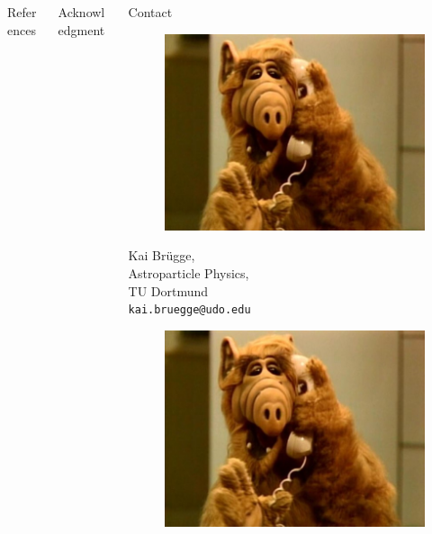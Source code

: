 \vfill
\begin{columns}[t, onlytextwidth]%
  \begin{column}{0.40\textwidth}%
    \begin{block}[equal height group=bottom]{\normalsize References}
      \footnotesize%
      \printbibliography%
    \end{block}
  \end{column}%
  \begin{column}{0.20\textwidth}%
    \begin{block}[equal height group=bottom]{\normalsize Acknowledgment}
        \footnotesize
        
    \end{block}
  \end{column}%
  \begin{column}{0.40\textwidth}%
    \begin{block}[equal height group=bottom]{\normalsize Contact}
      \begin{multicols}{4}
          \begin{figure}
            \includegraphics[width=0.5\linewidth]{images/alf.jpg}
          \end{figure}
          \columnbreak
              \footnotesize
                  Kai Brügge, \\
                  Astroparticle Physics, \\
                  TU Dortmund \\
                  \texttt{kai.bruegge@udo.edu}
          \columnbreak
            \begin{figure}
              \includegraphics[width=0.5\linewidth]{images/alf.jpg}

\end{figure}
\end{multicols}
\end{block}
\end{column}
\end{columns}
